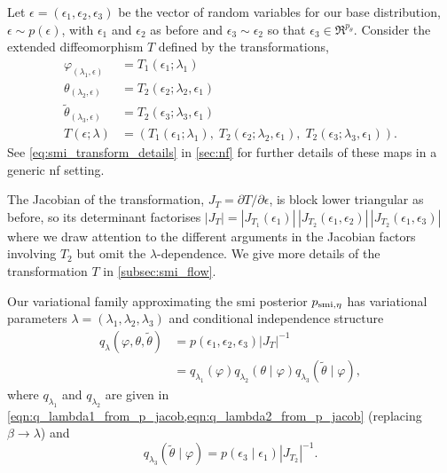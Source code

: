 Let $\epsilon=(\epsilon_1, \epsilon_2, \epsilon_3)$ be the vector of random variables for our base distribution, $\epsilon\sim p(\epsilon)$, with $\epsilon_1$ and $\epsilon_2$ as before and $\epsilon_3\sim \epsilon_2$ so that $\epsilon_3\in \Re^{p_\theta}$.
Consider the extended diffeomorphism $T$ defined by the transformations,
\begin{align}
  \varphi_{(\lambda_1,\epsilon)}      & =T_1(\epsilon_1;\lambda_1)\nonumber                                                                                                                     \\
  \theta_{(\lambda_2,\epsilon)}       & =T_2(\epsilon_2; \lambda_2, \epsilon_1)\nonumber                                                                                                        \\
  \tilde\theta_{(\lambda_3,\epsilon)} & =T_2(\epsilon_3; \lambda_3, \epsilon_1)\nonumber                                                                                                        \\
  T(\epsilon; \lambda)                & = \left( T_1(\epsilon_1;\lambda_1) ,\; T_2(\epsilon_2;\lambda_2, \epsilon_1) ,\; T_2(\epsilon_3;\lambda_3, \epsilon_1) \right).\label{eq:smi_transform}
\end{align}
See \cref{eq:smi_transform_details} in \cref{sec:nf} for further details of these maps in a generic \acrshort*{nf} setting.

The Jacobian of the transformation, $J_{T}=\partial T/\partial\epsilon$, is block lower triangular as before, so its determinant factorises $\left\vert J_{T} \right\vert  = \left\vert J_{T_1}(\epsilon_1) \right\vert \, \left\vert J_{T_2}(\epsilon_1,\epsilon_2) \right\vert \, \left\vert J_{T_2}(\epsilon_1,\epsilon_3) \right\vert$ where we draw attention to the different arguments in the Jacobian factors involving $T_2$ but omit the $\lambda$-dependence.
We give more details of the transformation $T$ in \cref{subsec:smi_flow}.

Our variational family approximating the \acrshort*{smi} posterior $p_{\operatorname{\text{smi}},\eta}$ has variational parameters $\lambda=(\lambda_1,\lambda_2,\lambda_3)$ and conditional independence structure
\begin{align}\label{eqn:q-lambda-smi-var}
  q_{\lambda}(\varphi, \theta, \tilde\theta) & = p(\epsilon_1, \epsilon_2, \epsilon_3) \left\vert J_{T} \right\vert ^{-1}
  \\
                                             & =q_{\lambda_1}(\varphi)q_{\lambda_2}(\theta\mid \varphi)q_{\lambda_3}(\tilde\theta\mid \varphi),\nonumber
\end{align}
where $q_{\lambda_1}$ and $q_{\lambda_2}$ are given in \cref{eqn:q_lambda1_from_p_jacob,eqn:q_lambda2_from_p_jacob} (replacing $\beta\to \lambda$) and
\begin{equation}
  q_{\lambda_3}(\tilde\theta\mid \varphi)=p(\epsilon_3\mid \epsilon_1) \left\vert J_{T_2} \right\vert ^{-1}.
\end{equation}

